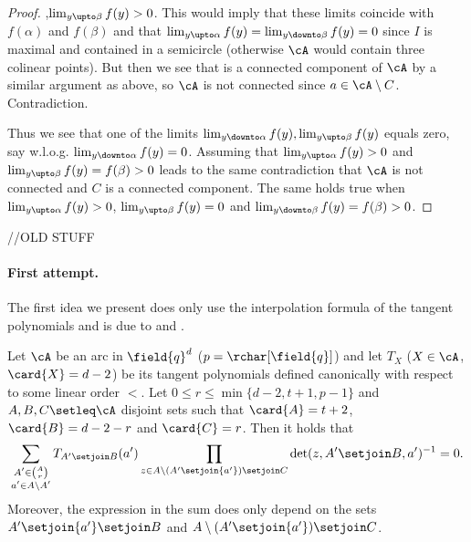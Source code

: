 \begin{proof}
    ,$\lim_{y\upto\beta}{f(y)}>0$. This would imply that these limits coincide with $f(\alpha)$ and $f(\beta)$ and that $\lim_{y\upto\alpha}{f(y)}=\lim_{y\downto\beta}{f(y)}=0$ since $I$ is maximal and contained in a semicircle (otherwise $\cA$ would contain three colinear points). But then we see that  is a connected component of $\cA$ by a similar argument as above, so $\cA$ is not connected since $a\in \cA\setminus C$. Contradiction.

    Thus we see that one of the limits $\lim_{y\downto\alpha}{f(y)},\lim_{y\upto\beta}{f(y)}$ equals zero, say w.l.o.g. $\lim_{y\downto\alpha}{f(y)}=0$. Assuming that $\lim_{y\upto\alpha}{f(y)}>0$ and $\lim_{y\upto\beta}{f(y)}=f(\beta)>0$ leads to the same contradiction that $\cA$ is not connected and $C$ is a connected component. The same holds true when $\lim_{y\upto\alpha}{f(y)}>0$, $\lim_{y\upto\beta}{f(y)}=0$ and $\lim_{y\downto\beta}{f(y)}=f(\beta)>0$. 
\end{proof}


\printindex


//OLD STUFF


\paragraph{First attempt.} The first idea we present does only use the interpolation formula of
the tangent polynomials and is due to  and
.

\begin{lemma}
  Let $\cA$ be an arc in $\field{q}^d$ ($p=\rchar[\field{q}]$) and let $T_X$
  ($X\in \cA$, $\card{X}=d-2$) be its tangent polynomials defined canonically with respect to some linear order $<$. Let $0\leq r\leq\min\{d-2,t+1,p-1\}$ and $A,B,C\setleq \cA$ disjoint sets such that $\card{A}=t+2$, $\card{B}=d-2-r$ and $\card{C}=r$. Then it holds that
  \begin{equation}
    \sum_{\substack{A'\in\binom{A}{r}\\ a'\in A\setminus A'}}{T_{A'\setjoin B}(a')\prod_{z\in A\setminus (A'\setjoin\{a'\})\setjoin C}\det(z,A'\setjoin B,a')^{-1}}=0\text{.}
  \end{equation}
  Moreover, the expression in the sum does only depend on the sets $A'\setjoin\{a'\}\setjoin B$ and $A\setminus (A'\setjoin\{a'\})\setjoin C$.
\end{lemma}

